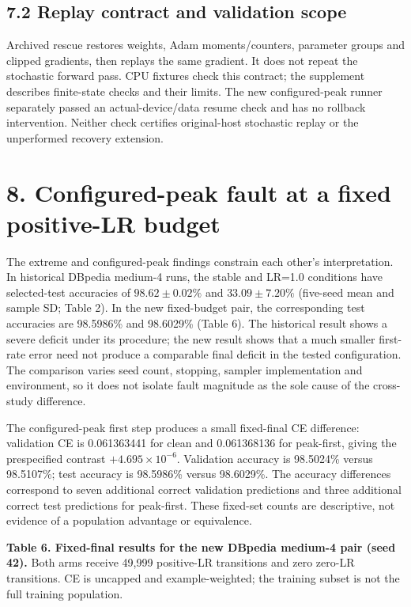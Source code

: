 \documentclass[smallextended]{svjour3}
\begin{document}
\subsection{7.2 Replay contract and validation scope}\label{replay-contract-and-validation-scope}

Archived rescue restores weights, Adam moments/counters, parameter groups and clipped gradients, then replays the same gradient. It does not repeat the stochastic forward pass. CPU fixtures check this contract; the supplement describes finite-state checks and their limits. The new configured-peak runner separately passed an actual-device/data resume check and has no rollback intervention. Neither check certifies original-host stochastic replay or the unperformed recovery extension.

\section{8. Configured-peak fault at a fixed positive-LR budget}\label{configured-peak-fault-at-a-fixed-positive-lr-budget}

The extreme and configured-peak findings constrain each other's interpretation. In historical DBpedia medium-4 runs, the stable and LR=1.0 conditions have selected-test accuracies of \(98.62\pm0.02\%\) and \(33.09\pm7.20\%\) (five-seed mean and sample SD; Table 2). In the new fixed-budget pair, the corresponding test accuracies are 98.5986\% and 98.6029\% (Table 6). The historical result shows a severe deficit under its procedure; the new result shows that a much smaller first-rate error need not produce a comparable final deficit in the tested configuration. The comparison varies seed count, stopping, sampler implementation and environment, so it does not isolate fault magnitude as the sole cause of the cross-study difference.

The configured-peak first step produces a small fixed-final CE difference: validation CE is 0.061363441 for clean and 0.061368136 for peak-first, giving the prespecified contrast \(+4.695\times10^{-6}\). Validation accuracy is 98.5024\% versus 98.5107\%; test accuracy is 98.5986\% versus 98.6029\%. The accuracy differences correspond to seven additional correct validation predictions and three additional correct test predictions for peak-first. These fixed-set counts are descriptive, not evidence of a population advantage or equivalence.


\textbf{Table 6. Fixed-final results for the new DBpedia medium-4 pair (seed 42).} Both arms receive 49,999 positive-LR transitions and zero zero-LR transitions. CE is uncapped and example-weighted; the training subset is not the full training population.
\end{document}
